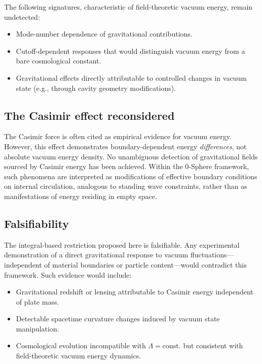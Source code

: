 \documentclass[12pt,letterpaper]{article}
\begin{document}
The following signatures, characteristic of field-theoretic vacuum energy, remain undetected:
\begin{itemize}
\item Mode-number dependence of gravitational contributions.
\item Cutoff-dependent responses that would distinguish vacuum energy from a bare cosmological constant.
\item Gravitational effects directly attributable to controlled changes in vacuum state (e.g., through cavity geometry modifications).
\end{itemize}

\subsection{The Casimir effect reconsidered}

The Casimir force is often cited as empirical evidence for vacuum energy. However, this effect demonstrates boundary-dependent energy \emph{differences}, not absolute vacuum energy density. No unambiguous detection of gravitational fields sourced by Casimir energy has been achieved. Within the 0-Sphere framework, such phenomena are interpreted as modifications of effective boundary conditions on internal circulation, analogous to standing wave constraints, rather than as manifestations of energy residing in empty space.

\subsection{Falsifiability}

The integral-based restriction proposed here is falsifiable. Any experimental demonstration of a direct gravitational response to vacuum fluctuations---independent of material boundaries or particle content---would contradict this framework. Such evidence would include:
\begin{itemize}
\item Gravitational redshift or lensing attributable to Casimir energy independent of plate mass.
\item Detectable spacetime curvature changes induced by vacuum state manipulation.
\item Cosmological evolution incompatible with $\Lambda = \mathrm{const.}$ but consistent with field-theoretic vacuum energy dynamics.
\end{itemize}
\end{document}
